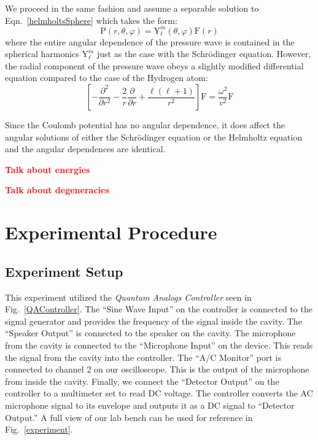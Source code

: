 \documentclass[12pt]{article}
\newcommand{\red}[1]{\textbf{\textcolor{red}{#1}}} %
\newcommand{\ppd}[1]{\frac{\partial}{\partial#1}}
\newcommand{\ppsd}[1]{\frac{\partial^2}{\partial #1^2}}
\newcommand{\figref}[1]{Fig.\ \ref{#1}}
\let\originaleqref=\eqref
\renewcommand{\eqref}{Eqn.\ \originaleqref}
\begin{document}
	We proceed in the same fashion and assume a separable solution to \eqref{helmholtsSphere} which takes the form:
	\begin{equation}
		\mathrm{P}(r,\theta,\varphi) = \mathrm{Y}_\ell^m(\theta,\varphi) \mathrm{F}(r)
	\end{equation}
	where the entire angular dependence of the pressure wave is contained in the spherical harmonics $\mathrm{Y}_\ell^m$ just as the case with the Schr\"odinger equation. However, the radial component of the pressure wave obeys a slightly modified differential equation compared to the case of the Hydrogen atom:
	\begin{equation}
		\left[ -\ppsd{r} - \frac{2}{r}\ppd{r} + \frac{\ell(\ell+1)}{r^2} \right] \mathrm{F} = \frac{\omega^2}{v^2}\mathrm{F}
	\end{equation}
		
	Since the Coulomb potential has no angular dependence, it does affect the angular solutions of  either the Schr\"odinger equation or the Helmholtz equation and the angular dependences are identical. 
	
	\red{Talk about energies}
	
	\red{Talk about degeneracies}
		
	
	
		
	\section{Experimental Procedure}
	
		\subsection{Experiment Setup}
		This experiment utilized the \emph{Quantum Analogs Controller} seen in \figref{QAController}. The ``Sine Wave Input'' on the controller is connected to the signal generator and provides the frequency of the signal inside the cavity. The ``Speaker Output'' is connected to the speaker on the cavity. The microphone from the cavity is connected to the ``Microphone Input'' on the device. This reads the signal from the cavity into the controller. The ``A/C Monitor'' port is connected to channel 2 on our oscilloscope. This is the output of the microphone from inside the cavity. Finally, we connect the ``Detector Output'' on the controller to a multimeter set to read DC voltage. The controller converts the AC microphone signal to its envelope and outputs it as a DC signal to ``Detector Output.'' A full view of our lab bench can be used for reference in \figref{experiment}.
		
\end{document}
